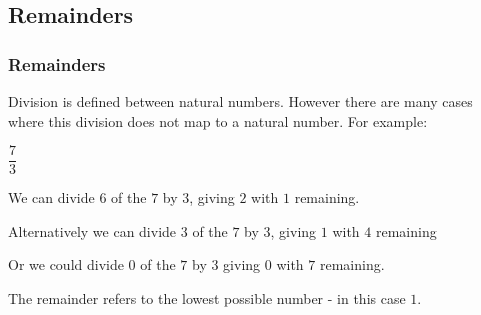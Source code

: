 
\subsection{Remainders}

\subsubsection{Remainders}

Division is defined between natural numbers. However there are many cases where this division does not map to a natural number. For example:

\(\dfrac{7}{3}\)

We can divide \(6\) of the \(7\) by \(3\), giving \(2\) with \(1\) remaining.

Alternatively we can divide \(3\) of the \(7\) by \(3\), giving \(1\) with \(4\) remaining

Or we could divide \(0\) of the \(7\) by \(3\) giving \(0\) with \(7\) remaining.

The remainder refers to the lowest possible number - in this case \(1\).

